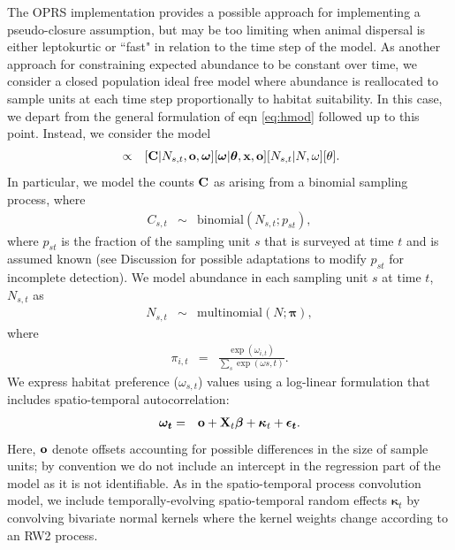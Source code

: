 \documentclass[times,mee,doublespace,]{besauth2}
\begin{document}
The OPRS implementation provides a possible approach for implementing a pseudo-closure assumption, but may be too limiting when animal dispersal is either leptokurtic or ``fast" in relation to the time step of the model.  As another approach for constraining expected abundance to be constant over time, we consider a closed population
ideal free model where abundance is reallocated to sample units at each time step proportionally to habitat suitability.  In this case, we depart from the general formulation of eqn \ref{eq:hmod} followed up to this point.  Instead, we consider the model
\begin{eqnarray}
  [N, N_{s,t}, \boldsymbol{\omega},\boldsymbol{\theta} | {\bf x},{\bf C},{\bf o},{\bf p}] & \propto & [{\bf C} | N_{s,t}, {\bf o}, \boldsymbol{\omega}] [\boldsymbol{\omega} | \boldsymbol{\theta},{\bf x},{\bf o}] [N_{s,t}|N,\omega] [\theta].
  \label{eq:cpif-post}
\end{eqnarray}
In particular, we model the counts ${\bf C}$ as arising from a binomial sampling process, where
\begin{eqnarray*}
  C_{s,t} & \sim & \textrm{binomial}(N_{s,t}; p_{st}),
\end{eqnarray*}
where $p_{st}$ is the fraction of the sampling unit $s$ that is surveyed at time $t$ and is assumed known (see Discussion for possible adaptations to modify $p_{st}$ for incomplete detection).
We model abundance in each sampling unit $s$ at time $t$, $N_{s,t}$ as
\begin{eqnarray*}
  N_{s,t} & \sim & \textrm{multinomial}(N; \boldsymbol{\pi}),
\end{eqnarray*}
where
\begin{eqnarray*}
  \pi_{i,t} & = & \frac{\exp(\omega_{i,t})}{\sum_s \exp(\omega{s,t})}.
\end{eqnarray*}
We express habitat preference ($\omega_{s,t}$) values using a log-linear formulation that includes spatio-temporal autocorrelation:
\begin{eqnarray*}
  \boldsymbol{\omega_t} & = & {\bf o} + {\bf X}_t \boldsymbol{\beta} + \boldsymbol{\kappa}_t + \boldsymbol{\epsilon_t}.
\end{eqnarray*}
Here, ${\bf o}$ denote offsets accounting for possible differences in the size of sample units; by convention we do not include an intercept in the regression part of the model as it is not identifiable.
As in the spatio-temporal process convolution model, we include temporally-evolving spatio-temporal random effects $\boldsymbol{\kappa}_t$ by convolving bivariate normal kernels where the kernel weights change according to an RW2 process.
\end{document}
